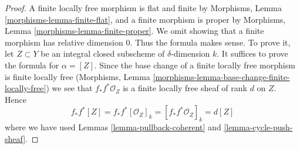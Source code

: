 \begin{proof}
A finite locally free morphism is flat and finite by
Morphisms, Lemma \ref{morphisms-lemma-finite-flat},
and a finite morphism is proper
by Morphisms, Lemma \ref{morphisms-lemma-finite-proper}.
We omit showing that a finite
morphism has relative dimension $0$. Thus the formula makes sense.
To prove it, let $Z \subset Y$ be an integral closed subscheme
of $\delta$-dimension $k$. It suffices to prove the formula
for $\alpha = [Z]$. Since the base change of a finite locally free
morphism is finite locally free
(Morphisms, Lemma \ref{morphisms-lemma-base-change-finite-locally-free})
we see that $f_*f^*\mathcal{O}_Z$ is a finite locally free sheaf of
rank $d$ on $Z$. Hence
$$
f_*f^*[Z] = f_*f^*[\mathcal{O}_Z]_k =
[f_*f^*\mathcal{O}_Z]_k = d[Z]
$$
where we have used Lemmas \ref{lemma-pullback-coherent} and
\ref{lemma-cycle-push-sheaf}.
\end{proof}








